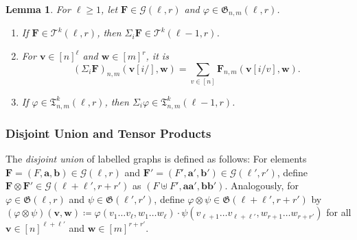 \documentclass[11pt, DIV=15]{scrarticle}
\theoremstyle{definition}
\theoremstyle{plain}
\newtheorem{lemma}[definition]{Lemma}
\theoremstyle{remark}
\renewcommand{\phi}{\varphi}
\begin{document}
	\begin{lemma}\label{lem:unlabelling}
		For $\ell \geq 1$,
		let $\boldsymbol{F} \in \mathcal{G}(\ell, r)$
		and $\phi \in \mathfrak{G}_{n,m}(\ell, r)$.
		\begin{enumerate}
			\item If $\boldsymbol{F} \in \mathcal{T}^k(\ell, r)$,
			then $\Sigma_i\boldsymbol{F} \in \mathcal{T}^k(\ell-1, r)$.
			\item For $\boldsymbol{v} \in [n]^\ell$ and $\boldsymbol{w} \in [m]^r$,  it is
					\[
			(\Sigma_i \boldsymbol{F})_{n,m}(\boldsymbol{v}[i/],\boldsymbol{w}) = \sum_{v \in [n]} \boldsymbol{F}_{n,m}(\boldsymbol{v}[i/v], \boldsymbol{w}).
			\]
			\item If $\phi \in \mathfrak{T}^k_{n,m}(\ell, r)$, then $\Sigma_i \phi \in \mathfrak{T}^k_{n,m}(\ell-1, r)$. 
		\end{enumerate}
	\end{lemma}

	\subsubsection{Disjoint Union and Tensor Products}

	The \emph{disjoint union} of labelled graphs is defined as follows:
	For elements $\boldsymbol{F} = (F, \boldsymbol{a}, \boldsymbol{b}) \in \mathcal{G}(\ell, r)$ and $\boldsymbol{F}' = (F', \boldsymbol{a}', \boldsymbol{b}') \in \mathcal{G}(\ell', r')$,
	define $\boldsymbol{F} \otimes \boldsymbol{F}' \in \mathcal{G}(\ell+\ell', r+r')$
	as $(F \uplus F', \boldsymbol{a}\boldsymbol{a}', \boldsymbol{b}\boldsymbol{b}')$.
	Analogously, for $\phi \in \mathfrak{G}(\ell ,r )$ and $\psi \in \mathfrak{G}(\ell', r')$,
	define $\phi \otimes \psi \in \mathfrak{G}(\ell+\ell', r+r')$ by $(\phi \otimes \psi)(\boldsymbol{v}, \boldsymbol{w}) \coloneqq \phi(v_1 \dots v_\ell, w_1 \dots w_\ell) \cdot \psi(v_{\ell+1} \dots v_{\ell+\ell'}, w_{r+1} \dots w_{r+r'})$ for all $\boldsymbol{v} \in [n]^{\ell+\ell'}$ and $\boldsymbol{w} \in [m]^{r+r'}$.
	
\end{document}
